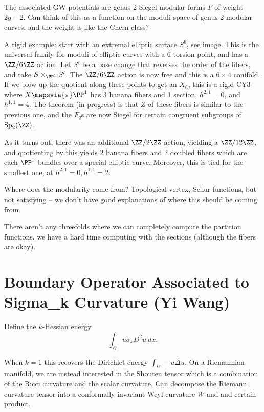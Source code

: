 The associated GW potentials are genus 2 Siegel modular forms \(F\) of
weight \(2g-2\). Can think of this as a function on the moduli space of
genus 2 modular curves, and the weight is like the Chern class?

A rigid example: start with an extremal elliptic surface \(S^6\), see
image. This is the universal family for moduli of elliptic curves with a
6-torsion point, and has a \(\ZZ/6\ZZ\) action. Let \(S'\) be a base
change that reverses the order of the fibers, and take
\(S\times_{\PP^1}S'\). The \(\ZZ/6\ZZ\) action is now free and this is a
\(6\times 4\) conifold. If we blow up the quotient along these points to
get an \(X_6\), this is a rigid CY3 where \(X\mapsvia{\pi} \PP^1\) has 3
banana fibers and 1 section, \(h^{2,1}=0\), and \(h^{1,1} = 4\). The
theorem (in progress) is that \(Z\) of these fibers is similar to the
previous one, and the \(F_q\)s are now Siegel for certain congruent
subgroups of \(\mathrm{Sp}_2(\ZZ)\).

As it turns out, there was an additional \(\ZZ/2\ZZ\) action, yielding a
\(\ZZ/12\ZZ\), and quotienting by this yields 2 banana fibers and 2
doubled fibers which are each \(\PP^1\) bundles over a special elliptic
curve. Moreover, this is tied for the smallest one, at
\(h^{2,1} = 0, h^{1,1} = 2\).

Where does the modularity come from? Topological vertex, Schur
functions, but not satisfying -- we don't have good explanations of
where this should be coming from.

There aren't any threefolds where we can completely compute the
partition functions, we have a hard time computing with the sections
(although the fibers are okay).

\hypertarget{boundary-operator-associated-to-sigma_k-curvature-yi-wang}{%
\section{Boundary Operator Associated to Sigma\_k Curvature (Yi
Wang)}\label{boundary-operator-associated-to-sigma_k-curvature-yi-wang}}

Define the \(k\)-Hessian energy \[
\int_\Omega u \sigma_k D^2 u ~dx.
\]

When \(k=1\) this recovers the Dirichlet energy
\(\int_\Omega -u\Delta u\). On a Riemannian manifold, we are instead
interested in the Shouten tensor which is a combination of the Ricci
curvature and the scalar curvature. Can decompose the Riemann curvature
tensor into a conformally invariant Weyl curvature \(W\) and and certain
product.

